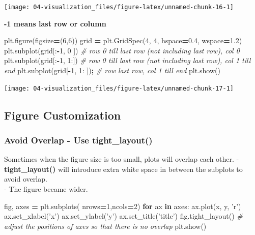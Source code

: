 \documentclass[
]{book}
\newenvironment{Shaded}{\begin{snugshade}}{\end{snugshade}}
\newcommand{\CommentTok}[1]{\textcolor[rgb]{0.37,0.37,0.37}{\textit{#1}}}
\newcommand{\ControlFlowTok}[1]{\textcolor[rgb]{0.27,0.27,0.27}{\textbf{#1}}}
\newcommand{\DecValTok}[1]{\textcolor[rgb]{0.06,0.06,0.06}{#1}}
\newcommand{\FloatTok}[1]{\textcolor[rgb]{0.06,0.06,0.06}{#1}}
\newcommand{\KeywordTok}[1]{\textcolor[rgb]{0.27,0.27,0.27}{\textbf{#1}}}
\newcommand{\NormalTok}[1]{#1}
\newcommand{\OperatorTok}[1]{\textcolor[rgb]{0.43,0.43,0.43}{\textbf{#1}}}
\newcommand{\StringTok}[1]{\textcolor[rgb]{0.5,0.5,0.5}{#1}}
\begin{document}
\texttt{[image: 04-visualization\_files/figure-latex/unnamed-chunk-16-1]}

\textbf{-1 means last row or column}

\begin{Shaded}
\begin{Highlighting}[]
\NormalTok{plt.figure(figsize}\OperatorTok{=}\NormalTok{(}\DecValTok{6}\NormalTok{,}\DecValTok{6}\NormalTok{))}
\NormalTok{grid }\OperatorTok{=}\NormalTok{ plt.GridSpec(}\DecValTok{4}\NormalTok{, }\DecValTok{4}\NormalTok{, hspace}\OperatorTok{=}\FloatTok{0.4}\NormalTok{, wspace}\OperatorTok{=}\FloatTok{1.2}\NormalTok{)}
\NormalTok{plt.subplot(grid[:}\OperatorTok{-}\DecValTok{1}\NormalTok{, }\DecValTok{0}\NormalTok{ ])  }\CommentTok{# row 0 till last row (not including last row), col 0}
\NormalTok{plt.subplot(grid[:}\OperatorTok{-}\DecValTok{1}\NormalTok{, }\DecValTok{1}\NormalTok{:])  }\CommentTok{# row 0 till last row (not including last row), col 1 till end}
\NormalTok{plt.subplot(grid[}\OperatorTok{-}\DecValTok{1}\NormalTok{, }\DecValTok{1}\NormalTok{: ])}\OperatorTok{;} \CommentTok{# row last row, col 1 till end}
\NormalTok{plt.show()}
\end{Highlighting}
\end{Shaded}

\texttt{[image: 04-visualization\_files/figure-latex/unnamed-chunk-17-1]}

\hypertarget{figure-customization}{%
\subsection{Figure Customization}\label{figure-customization}}

\hypertarget{avoid-overlap---use-tight_layout}{%
\subsubsection{Avoid Overlap - Use tight\_layout()}\label{avoid-overlap---use-tight_layout}}

Sometimes when the figure size is too small, plots will overlap each other. - \textbf{tight\_layout()} will introduce extra white space in between the subplots to avoid overlap.\\
- The figure became wider.

\begin{Shaded}
\begin{Highlighting}[]
\NormalTok{fig, axes }\OperatorTok{=}\NormalTok{ plt.subplots( nrows}\OperatorTok{=}\DecValTok{1}\NormalTok{,ncols}\OperatorTok{=}\DecValTok{2}\NormalTok{)}
\ControlFlowTok{for}\NormalTok{ ax }\KeywordTok{in}\NormalTok{ axes:}
\NormalTok{    ax.plot(x, y, }\StringTok{'r'}\NormalTok{)}
\NormalTok{    ax.set_xlabel(}\StringTok{'x'}\NormalTok{)}
\NormalTok{    ax.set_ylabel(}\StringTok{'y'}\NormalTok{)}
\NormalTok{    ax.set_title(}\StringTok{'title'}\NormalTok{)}
\NormalTok{fig.tight_layout() }\CommentTok{# adjust the positions of axes so that there is no overlap}
\NormalTok{plt.show()}
\end{Highlighting}
\end{Shaded}
\end{document}
